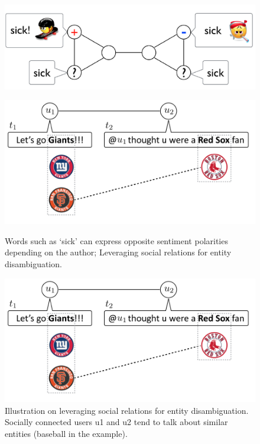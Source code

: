 \begin{figure}[h]
\centering
\begin{minipage}{.5\textwidth}
  \centering
  \includegraphics[width=1\linewidth]{sick}
    \label{fig:test1}
\end{minipage}%
\begin{minipage}{.5\textwidth}
  \centering
  \includegraphics[width=1\linewidth]{Giant}
  
  \label{fig:test2}
\end{minipage}
\caption{Words such as ‘sick’ can express opposite sentiment
polarities depending on the author; Leveraging social relations for entity
disambiguation.}
\end{figure}

\begin{figure}[h]
\centering
\begin{minipage}{.5\textwidth}
  \centering
  \includegraphics[width=1\linewidth]{Giant}
  \caption{Illustration on leveraging social relations for entity
disambiguation. Socially connected users u1 and u2 tend to
talk about similar entities (baseball in the example).}
  \label{fig:test2}
\end{minipage}
\end{figure}


